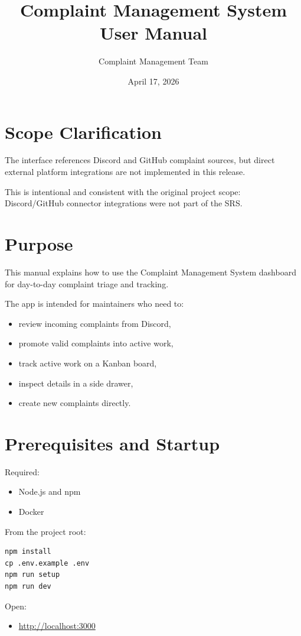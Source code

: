 \documentclass[11pt,a4paper]{article}
\title{Complaint Management System\\User Manual}
\author{Complaint Management Team}
\date{April 17, 2026}
\begin{document}
\maketitle
\tableofcontents
\newpage

\section{Scope Clarification}
The interface references Discord and GitHub complaint sources, but direct external platform integrations are not implemented in this release.

This is intentional and consistent with the original project scope: Discord/GitHub connector integrations were not part of the SRS.

\section{Purpose}
This manual explains how to use the Complaint Management System dashboard for day-to-day complaint triage and tracking.

The app is intended for maintainers who need to:
\begin{itemize}
  \item review incoming complaints from Discord,
  \item promote valid complaints into active work,
  \item track active work on a Kanban board,
  \item inspect details in a side drawer,
  \item create new complaints directly.
\end{itemize}

\section{Prerequisites and Startup}
Required:
\begin{itemize}
  \item Node.js and npm
  \item Docker
\end{itemize}

From the project root:
\begin{verbatim}
npm install
cp .env.example .env
npm run setup
npm run dev
\end{verbatim}

Open:
\begin{itemize}
  \item \url{http://localhost:3000}
\end{itemize}
\end{document}
